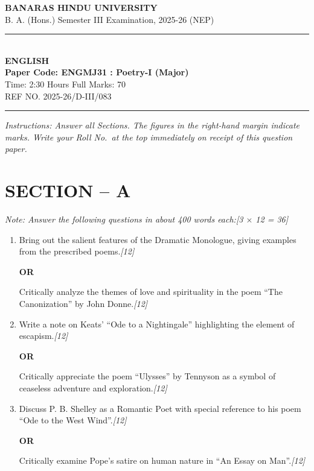 \documentclass[11pt,a4paper]{article}
\newcommand{\pts}[1]{\hfill \textit{[#1]}}
\begin{document}
\begin{center}
  {\large\bfseries BANARAS HINDU UNIVERSITY}\\[2pt]
  {\normalsize B. A. (Hons.) Semester III Examination, 2025-26 (NEP)}\\[6pt]
  \rule{0.8\linewidth}{0.5pt}\\[6pt]
  {\large\bfseries ENGLISH}\\[4pt]
  {\large\bfseries Paper Code: ENGMJ31 : Poetry-I (Major)}\\[4pt]
  {\normalsize Time: 2:30 Hours \hfill Full Marks: 70}\\[2pt]
  {\small REF NO. 2025-26/D-III/083}
\end{center}
\rule{\linewidth}{0.4pt}
\smallskip

\noindent \textit{Instructions: Answer all Sections. The figures in the right-hand margin indicate marks. Write your Roll No.\ at the top immediately on receipt of this question paper.}

\bigskip

\section*{SECTION -- A}
\noindent \textit{Note: Answer the following questions in about 400 words each:}\pts{3 $\times$ 12 = 36}

\begin{enumerate}[label=\textbf{\arabic*.},leftmargin=*,itemsep=12pt]

  \item Bring out the salient features of the Dramatic Monologue, giving examples from the prescribed poems.\pts{12}

  \begin{center}\textbf{OR}\end{center}

  Critically analyze the themes of love and spirituality in the poem ``The Canonization'' by John Donne.\pts{12}

  \item Write a note on Keats' ``Ode to a Nightingale'' highlighting the element of escapism.\pts{12}

  \begin{center}\textbf{OR}\end{center}

  Critically appreciate the poem ``Ulysses'' by Tennyson as a symbol of ceaseless adventure and exploration.\pts{12}

  \item Discuss P. B. Shelley as a Romantic Poet with special reference to his poem ``Ode to the West Wind''.\pts{12}

  \begin{center}\textbf{OR}\end{center}

  Critically examine Pope's satire on human nature in ``An Essay on Man''.\pts{12}

\end{enumerate}
\end{document}
